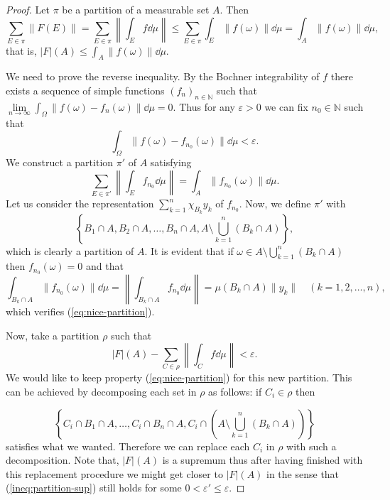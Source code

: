 \documentclass[a4paper, 12pt]{article}
\begin{document}
\begin{proof}
Let $\pi$ be a partition of a measurable set $A$. Then
$$\sum_{E \in \pi} \| F(E) \|  = \sum_{E \in \pi} \left \| \int_{E} f \dd{\mu} \right \| \leqslant \sum_{E \in \pi} \int_{E} \| f(\omega) \| \dd{\mu} = \int_{A} \| f(\omega) \| \dd{\mu},$$
that is, $|F|(A) \leqslant \int_{A} \| f(\omega) \| \dd{\mu}.$

We need to prove the reverse inequality. By the Bochner integrability of $f$ there exists a sequence of simple functions $(f_n)_{n \in \mathbb{N}}$ such
that $\lim\limits_{n\to \infty}\int_{\Omega} \| f(\omega) - f_n(\omega) \| \dd{\mu} = 0.$
Thus for any $\varepsilon > 0$ we can fix $n_0 \in \mathbb{N}$ such that
$$\int_{\Omega} \|f(\omega) - f_{n_0}(\omega) \| \dd{\mu} < \varepsilon.$$
We construct a partition $\pi'$ of $A$ satisfying
\begin{equation} \label{eq:nice-partition}
\sum_{E \in \pi'} \left \| \int_{E} f_{n_0} \dd{\mu} \right \| = \int_{A} \| f_{n_0}(\omega) \| \dd{\mu}.
\end{equation}
Let us consider the representation $\sum^{n}_{k=1} \chi_{B_k} y_k$ of $f_{n_0}$. Now, we define $\pi'$ with 
$$\left \lbrace B_1 \cap A, B_2 \cap A, \ldots, B_n \cap A, A \setminus \bigcup^{n}_{k=1} (B_k \cap A) \right \rbrace,$$
which is clearly a partition of $A$. It is evident that if $\omega \in A \setminus \bigcup^{n}_{k=1} (B_k \cap A)$ then $f_{n_0}(\omega) = 0$ and that
$$\int_{B_k \cap A} \| f_{n_0}(\omega) \| \dd{\mu} = \left \| \int_{B_k \cap A} f_{n_0} \dd{\mu} \right \| = \mu(B_k \cap A) \| y_k\| \quad (k = 1,2,\ldots,n),$$
which verifies (\ref{eq:nice-partition}).

Now, take a partition $\rho$ such that
\begin{equation}\label{ineq:partition-sup}
|F|(A) - \sum_{C \in \rho}  \left \| \int_{C} f \dd{\mu} \right \| < \varepsilon.
\end{equation}
We would like to keep property (\ref{eq:nice-partition}) for this new partition. This can be achieved by decomposing each set in $\rho$ as follows: if $C_i \in \rho$ then

$$\left \lbrace C_i \cap B_1 \cap A, \ldots, C_i \cap B_n \cap A , C_i  \cap \left(A \setminus \bigcup^{n}_{k=1} (B_k \cap A) \right) \right\rbrace$$
satisfies what we wanted. Therefore we can replace each $C_i$ in $\rho$ with such a decomposition. Note that, $|F|(A)$ is a supremum thus after having finished with this replacement procedure we might get closer to $|F|(A)$ in the sense that (\ref{ineq:partition-sup}) still holds for some $0 < \varepsilon' \leqslant \varepsilon$.


\end{proof}
\end{document}
